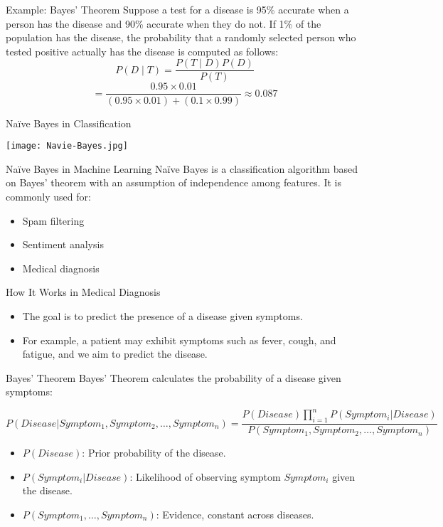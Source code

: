 \documentclass[serif, aspectratio=169]{beamer}
\begin{document}
\begin{frame}{Example: Bayes' Theorem}
    Suppose a test for a disease is 95\% accurate when a person has the disease and 90\% accurate when they do not.
    If 1\% of the population has the disease, the probability that a randomly selected person who tested positive actually has the disease is computed as follows:
    \begin{equation}
        P(D \mid T) = \frac{P(T \mid D) P(D)}{P(T)}
    \end{equation}
    \begin{equation}
        = \frac{0.95 \times 0.01}{(0.95 \times 0.01) + (0.1 \times 0.99)} \approx 0.087
    \end{equation}
\end{frame}

\begin{frame}{Naïve Bayes in Classification}
    
    \centering
    \texttt{[image: Navie-Bayes.jpg]}
\end{frame}

\begin{frame}{Naïve Bayes in Machine Learning}
    Naïve Bayes is a classification algorithm based on Bayes' theorem with an assumption of independence among features.
    It is commonly used for:
    \begin{itemize}
        \item Spam filtering
        \item Sentiment analysis
        \item Medical diagnosis
    \end{itemize}
\end{frame}

\begin{frame}{How It Works in Medical Diagnosis}
\begin{itemize}
    \item The goal is to predict the presence of a disease given symptoms.
    \item For example, a patient may exhibit symptoms such as fever, cough, and fatigue, and we aim to predict the disease.
\end{itemize}
\end{frame}

\begin{frame}{Bayes' Theorem}
Bayes' Theorem calculates the probability of a disease given symptoms:

\[
P(Disease|Symptom_1, Symptom_2, \dots, Symptom_n) = \frac{P(Disease) \prod_{i=1}^{n} P(Symptom_i|Disease)}{P(Symptom_1, Symptom_2, \dots, Symptom_n)}
\]

\begin{itemize}
    \item \( P(Disease) \): Prior probability of the disease.
    \item \( P(Symptom_i|Disease) \): Likelihood of observing symptom \( Symptom_i \) given the disease.
    \item \( P(Symptom_1, \dots, Symptom_n) \): Evidence, constant across diseases.
\end{itemize}
\end{frame}
\end{document}

